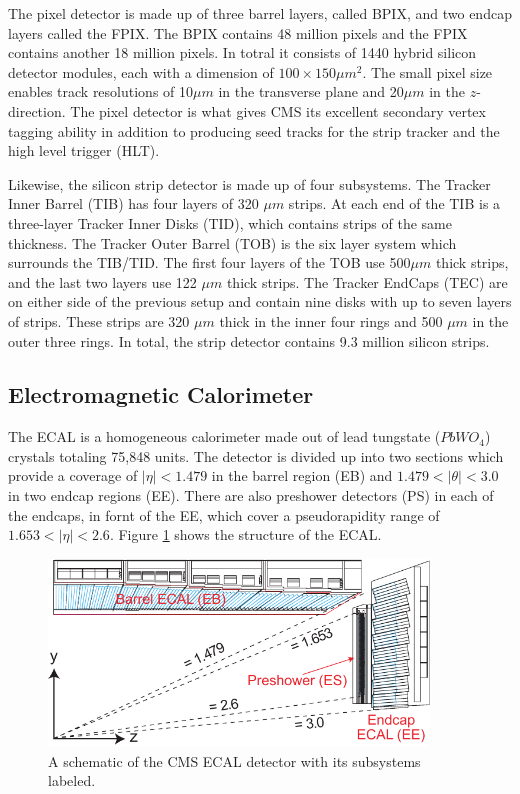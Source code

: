 The pixel detector is made up of three barrel layers, called BPIX, and two endcap layers called the FPIX. The BPIX contains 48 million pixels and the FPIX contains another 18 million pixels. In totral it consists of 1440 hybrid silicon detector modules, each with a dimension of $100 \times 150 \mu m^{2}$. The small pixel size enables track resolutions of 10$\mu m$ in the transverse plane and 20$\mu m$ in the $z$-direction. The pixel detector is what gives CMS its excellent secondary vertex tagging ability in addition to producing seed tracks for the strip tracker and the high level trigger (HLT).

Likewise, the silicon strip detector is made up of four subsystems. The Tracker Inner Barrel (TIB) has four layers of 320 $\mu m$ strips. At each end of the TIB is a three-layer Tracker Inner Disks (TID), which contains strips of the same thickness. The Tracker Outer Barrel (TOB) is the six layer system which surrounds the TIB/TID. The first four layers of the TOB use 500$\mu m$ thick strips, and the last two layers use 122 $\mu m$ thick strips. The Tracker EndCaps (TEC) are on either side of the previous setup and contain nine disks with up to seven layers of strips. These strips are 320 $\mu m$ thick in the inner four rings and 500 $\mu m$ in the outer three rings. In total, the strip detector contains 9.3 million silicon strips.

 \subsection{Electromagnetic Calorimeter}

 The ECAL is a homogeneous calorimeter made out of lead tungstate ($PbWO_{4}$) crystals totaling 75,848 units. The detector is divided up into two sections which provide a coverage of $|\eta| < 1.479$ in the barrel region (EB) and $1.479 < |\theta| < 3.0$ in two endcap regions (EE). There are also preshower detectors (PS) in each of the endcaps, in fornt of the EE, which cover a pseudorapidity range of $1.653 < |\eta| < 2.6$. Figure \ref{fig:cmsecal} shows the structure of the ECAL.

    \begin{figure}[H]
 	\centering
 	\includegraphics[width=0.9\textwidth]{figures/ECAL_transverse_Section.pdf}
 	\singlespace
 	\caption{A schematic of the CMS ECAL detector with its subsystems labeled.}
 	\label{fig:cmsecal}
	 \end{figure}

